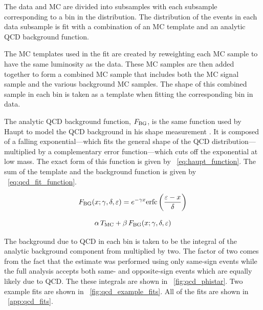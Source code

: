 The data and MC are divided into subsamples with each subsample corresponding
to a bin in the \phistar distribution. The \mee distribution of the events in
each data subsample is fit with a combination of an MC template and an analytic
QCD background function.

The MC templates used in the fit are created by reweighting each MC sample to
have the same luminosity as the data. These MC samples are then added together to
form a combined MC sample that includes both the MC \MADGRAPH signal sample and
the various background MC samples. The shape of this combined sample in each
\phistar bin is taken as a template when fitting the corresponding bin in data.

The analytic QCD background function, $F_{\text{BG}}$, is the same function used by
Haupt to model the QCD background in his \Ztoee shape measurement
\cite{haupt_2011}. It is composed of a falling exponential---which fits the
general shape of the QCD distribution---multiplied by a complementary error
function---which cuts off the exponential at low mass. The exact form of this
function is given by \EQ~\ref{eq:haupt_function}. The sum of the template and
the background function is given by \EQ~\ref{eq:qcd_fit_function}.

\begin{equation}\label{eq:haupt_function}
    F_{\text{BG}}(x; \gamma, \delta, \varepsilon) = e^{- \gamma x} {\mathrm{erfc}} \left( \frac{\varepsilon - x}{\delta} \right)
\end{equation}

\begin{equation}\label{eq:qcd_fit_function}
    \alpha \, T_{\text{MC}} + \beta \, F_{\text{BG}}(x; \gamma, \delta, \varepsilon)
\end{equation}

The background due to QCD in each \phistar bin is taken to be the integral of
the analytic background component from \MassRange multiplied by two. The factor
of two comes from the fact that the estimate was performed using only same-sign
events while the full analysis accepts both same- and opposite-sign events
which are equally likely due to QCD. The these integrals are shown in
\FIG~\ref{fig:qcd_phistar}. Two example fits are shown in
\FIG~\ref{fig:qcd_example_fits}. All of the fits are shown in
\APP~\ref{app:qcd_fits}.

